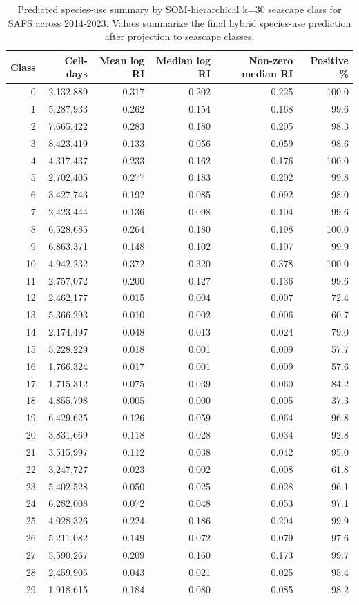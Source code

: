 \begin{table}[htbp]
\centering
\scriptsize
\caption{Predicted species-use summary by SOM-hierarchical k=30 seascape class for SAFS across 2014-2023. Values summarize the final hybrid species-use prediction after projection to seascape classes.}
\label{tab:appendix-predicted-seascape-use-safs}
\begin{tabular}{rrrrrr}
\hline
Class & Cell-days & Mean log RI & Median log RI & Non-zero median RI & Positive \% \\
\hline
0 & 2,132,889 & 0.317 & 0.202 & 0.225 & 100.0 \\
1 & 5,287,933 & 0.262 & 0.154 & 0.168 & 99.6 \\
2 & 7,665,422 & 0.283 & 0.180 & 0.205 & 98.3 \\
3 & 8,423,419 & 0.133 & 0.056 & 0.059 & 98.6 \\
4 & 4,317,437 & 0.233 & 0.162 & 0.176 & 100.0 \\
5 & 2,702,405 & 0.277 & 0.183 & 0.202 & 99.8 \\
6 & 3,427,743 & 0.192 & 0.085 & 0.092 & 98.0 \\
7 & 2,423,444 & 0.136 & 0.098 & 0.104 & 99.6 \\
8 & 6,528,685 & 0.264 & 0.180 & 0.198 & 100.0 \\
9 & 6,863,371 & 0.148 & 0.102 & 0.107 & 99.9 \\
10 & 4,942,232 & 0.372 & 0.320 & 0.378 & 100.0 \\
11 & 2,757,072 & 0.200 & 0.127 & 0.136 & 99.6 \\
12 & 2,462,177 & 0.015 & 0.004 & 0.007 & 72.4 \\
13 & 5,366,293 & 0.010 & 0.002 & 0.006 & 60.7 \\
14 & 2,174,497 & 0.048 & 0.013 & 0.024 & 79.0 \\
15 & 5,228,229 & 0.018 & 0.001 & 0.009 & 57.7 \\
16 & 1,766,324 & 0.017 & 0.001 & 0.009 & 57.6 \\
17 & 1,715,312 & 0.075 & 0.039 & 0.060 & 84.2 \\
18 & 4,855,798 & 0.005 & 0.000 & 0.005 & 37.3 \\
19 & 6,429,625 & 0.126 & 0.059 & 0.064 & 96.8 \\
20 & 3,831,669 & 0.118 & 0.028 & 0.034 & 92.8 \\
21 & 3,515,997 & 0.112 & 0.038 & 0.042 & 95.0 \\
22 & 3,247,727 & 0.023 & 0.002 & 0.008 & 61.8 \\
23 & 5,402,528 & 0.050 & 0.025 & 0.028 & 96.1 \\
24 & 6,282,008 & 0.072 & 0.048 & 0.053 & 97.1 \\
25 & 4,028,326 & 0.224 & 0.186 & 0.204 & 99.9 \\
26 & 5,211,082 & 0.149 & 0.072 & 0.079 & 97.6 \\
27 & 5,590,267 & 0.209 & 0.160 & 0.173 & 99.7 \\
28 & 2,459,905 & 0.043 & 0.021 & 0.025 & 95.4 \\
29 & 1,918,615 & 0.184 & 0.080 & 0.085 & 98.2 \\
\hline
\end{tabular}
\end{table}
